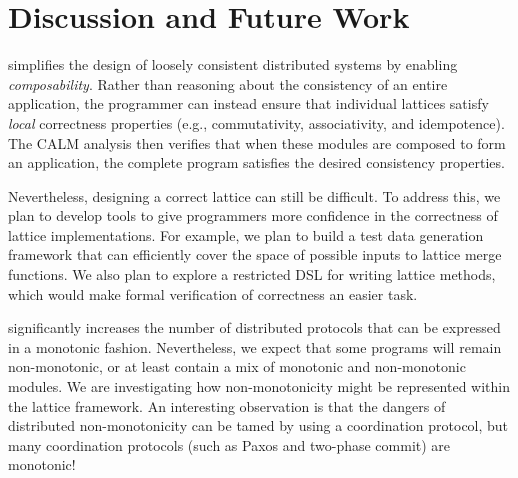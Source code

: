 \section{Discussion and Future Work}
\label{sec:discussion}

\lang simplifies the design of loosely consistent distributed systems by
enabling \emph{composability}. Rather than reasoning about the consistency of an
entire application, the programmer can instead ensure that individual lattices
satisfy \emph{local} correctness properties (e.g., commutativity, associativity,
and idempotence). The CALM analysis then verifies that when these modules are
composed to form an application, the complete program satisfies the desired
consistency properties.

Nevertheless, designing a correct lattice can still be difficult. To address
this, we plan to develop tools to give programmers more confidence in the
correctness of lattice implementations. For example, we plan to build a test
data generation framework that can efficiently cover the space of possible
inputs to lattice merge functions. We also plan to explore a restricted DSL for
writing lattice methods, which would make formal verification of correctness an
easier task.

\lang significantly increases the number of distributed protocols that can be
expressed in a monotonic fashion. Nevertheless, we expect that some programs
will remain non-monotonic, or at least contain a mix of monotonic and
non-monotonic modules. We are investigating how non-monotonicity might be
represented within the lattice framework. An interesting observation is that the
dangers of distributed non-monotonicity can be tamed by using a coordination
protocol, but many coordination protocols (such as Paxos and two-phase commit)
are monotonic!
